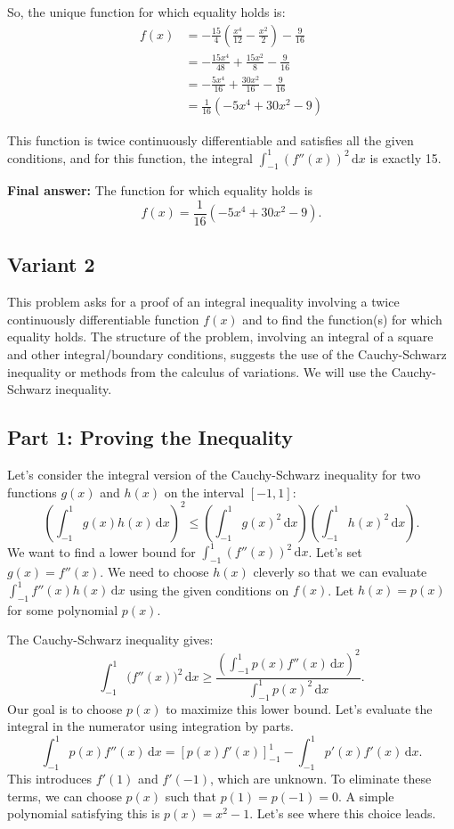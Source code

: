 \documentclass[12pt,a4paper]{article}
\theoremstyle{definition}
\begin{document}
So, the unique function for which equality holds is:
\begin{align*}
f(x) &= -\frac{15}{4}\left(\frac{x^4}{12} - \frac{x^2}{2}\right) - \frac{9}{16} \\
&= -\frac{15x^4}{48} + \frac{15x^2}{8} - \frac{9}{16} \\
&= -\frac{5x^4}{16} + \frac{30x^2}{16} - \frac{9}{16} \\
&= \frac{1}{16}(-5x^4 + 30x^2 - 9)
\end{align*}

This function is twice continuously differentiable and satisfies all the given conditions, and for this function, the integral $\int_{-1}^{1} (f''(x))^2\,\mathrm{d}x$ is exactly 15.

\textbf{Final answer:}
The function for which equality holds is
\[ f(x) = \frac{1}{16}(-5x^4 + 30x^2 - 9). \]


\subsection{Variant 2}
    This problem asks for a proof of an integral inequality involving a twice continuously differentiable function $f(x)$ and to find the function(s) for which equality holds. The structure of the problem, involving an integral of a square and other integral/boundary conditions, suggests the use of the Cauchy-Schwarz inequality or methods from the calculus of variations. We will use the Cauchy-Schwarz inequality.

    \subsection*{Part 1: Proving the Inequality}

    Let's consider the integral version of the Cauchy-Schwarz inequality for two functions $g(x)$ and $h(x)$ on the interval $[-1, 1]$:
    \[
        \left( \int_{-1}^{1} g(x)h(x)\,\mathrm{d}x \right)^2 \le \left( \int_{-1}^{1} g(x)^2\,\mathrm{d}x \right) \left( \int_{-1}^{1} h(x)^2\,\mathrm{d}x \right).
    \]
    We want to find a lower bound for $\int_{-1}^{1} (f''(x))^2 \,\mathrm{d}x$. Let's set $g(x) = f''(x)$. We need to choose $h(x)$ cleverly so that we can evaluate $\int_{-1}^{1} f''(x)h(x)\,\mathrm{d}x$ using the given conditions on $f(x)$. Let $h(x) = p(x)$ for some polynomial $p(x)$.

    The Cauchy-Schwarz inequality gives:
    \[
        \int_{-1}^{1} \bigl(f''(x)\bigr)^2 \,\mathrm{d}x \ge \frac{\left(\int_{-1}^{1} p(x)f''(x)\,\mathrm{d}x\right)^2}{\int_{-1}^{1} p(x)^2\,\mathrm{d}x}.
    \]
    Our goal is to choose $p(x)$ to maximize this lower bound. Let's evaluate the integral in the numerator using integration by parts.
    \[
        \int_{-1}^{1} p(x)f''(x)\,\mathrm{d}x = \left[p(x)f'(x)\right]_{-1}^{1} - \int_{-1}^{1} p'(x)f'(x)\,\mathrm{d}x.
    \]
    This introduces $f'(1)$ and $f'(-1)$, which are unknown. To eliminate these terms, we can choose $p(x)$ such that $p(1)=p(-1)=0$. A simple polynomial satisfying this is $p(x) = x^2 - 1$. Let's see where this choice leads.
\end{document}
